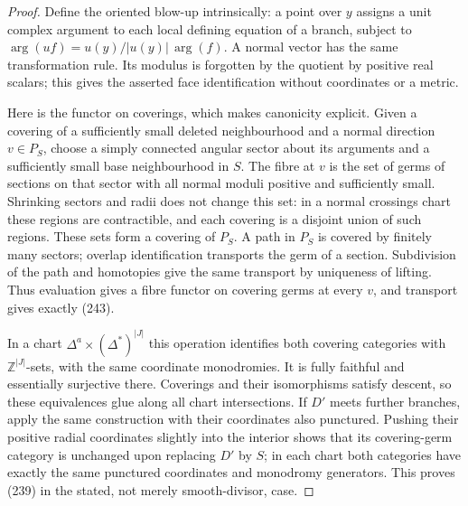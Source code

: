 \begin{proof}
Define the oriented blow-up intrinsically: a point over $y$ assigns
a unit complex argument to each local defining equation of a branch,
subject to $\arg(uf)=u(y)/|u(y)|\,\arg(f)$. A normal vector has the
same transformation rule. Its modulus is forgotten by the quotient
by positive real scalars; this gives the asserted face identification
without coordinates or a metric.

Here is the functor on coverings, which makes canonicity explicit.
Given a covering of a sufficiently small deleted neighbourhood and
a normal direction $v\in P_S$, choose a simply connected angular
sector about its arguments and a sufficiently small base neighbourhood
in $S$. The fibre at $v$ is the set of germs of sections on that
sector with all normal moduli positive and sufficiently small.
Shrinking sectors and radii does not change this set: in a normal
crossings chart these regions are contractible, and each covering is
a disjoint union of such regions. These sets form a covering of
$P_S$. A path in $P_S$ is covered by finitely many sectors; overlap
identification transports the germ of a section. Subdivision of the
path and homotopies give the same transport by uniqueness of lifting.
Thus evaluation gives a fibre functor on covering germs at every
$v$, and transport gives exactly (243).

In a chart $\Delta^a\times(\Delta^*)^{|J|}$ this operation identifies
both covering categories with $\mathbb Z^{|J|}$-sets, with the same
coordinate monodromies. It is fully faithful and essentially
surjective there. Coverings and their isomorphisms satisfy descent,
so these equivalences glue along all chart intersections. If $D'$
meets further branches, apply the same construction with their
coordinates also punctured. Pushing their positive radial coordinates
slightly into the interior shows that its covering-germ category is
unchanged upon replacing $D'$ by $S$; in each chart both categories
have exactly the same punctured coordinates and monodromy generators.
This proves (239) in the stated, not merely smooth-divisor, case.


\end{proof}

